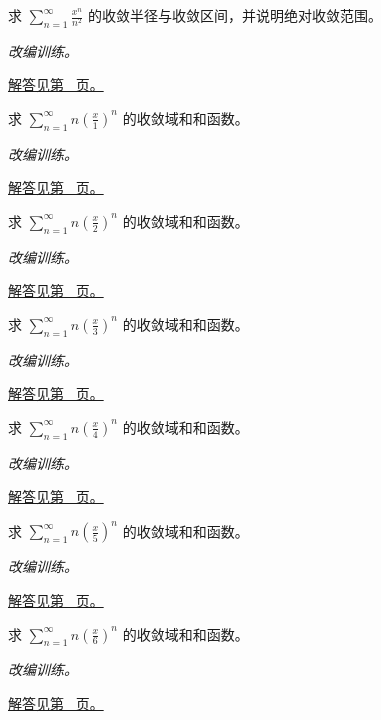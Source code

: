 \documentclass[12pt,fontset=fandol]{ctexart}
\begin{document}
\begin{example}[交错幂级数的端点]\label{ex:c26q7}
求 $\displaystyle\sum_{n=1}^\infty\frac{x^n}{n^{2}}$ 的收敛半径与收敛区间，并说明绝对收敛范围。
\par\textit{改编训练。}\par\hyperref[ans:c26q7]{解答见第~\pageref{ans:c26q7} 页。}
\end{example}
\begin{example}[几何级数导出的和函数]\label{ex:c26q8}
求 $\displaystyle\sum_{n=1}^\infty n\left(\frac x{1}\right)^n$ 的收敛域和和函数。
\par\textit{改编训练。}\par\hyperref[ans:c26q8]{解答见第~\pageref{ans:c26q8} 页。}
\end{example}
\begin{example}[几何级数导出的和函数]\label{ex:c26q9}
求 $\displaystyle\sum_{n=1}^\infty n\left(\frac x{2}\right)^n$ 的收敛域和和函数。
\par\textit{改编训练。}\par\hyperref[ans:c26q9]{解答见第~\pageref{ans:c26q9} 页。}
\end{example}
\begin{example}[几何级数导出的和函数]\label{ex:c26q10}
求 $\displaystyle\sum_{n=1}^\infty n\left(\frac x{3}\right)^n$ 的收敛域和和函数。
\par\textit{改编训练。}\par\hyperref[ans:c26q10]{解答见第~\pageref{ans:c26q10} 页。}
\end{example}
\begin{example}[几何级数导出的和函数]\label{ex:c26q11}
求 $\displaystyle\sum_{n=1}^\infty n\left(\frac x{4}\right)^n$ 的收敛域和和函数。
\par\textit{改编训练。}\par\hyperref[ans:c26q11]{解答见第~\pageref{ans:c26q11} 页。}
\end{example}
\begin{example}[几何级数导出的和函数]\label{ex:c26q12}
求 $\displaystyle\sum_{n=1}^\infty n\left(\frac x{5}\right)^n$ 的收敛域和和函数。
\par\textit{改编训练。}\par\hyperref[ans:c26q12]{解答见第~\pageref{ans:c26q12} 页。}
\end{example}
\begin{example}[几何级数导出的和函数]\label{ex:c26q13}
求 $\displaystyle\sum_{n=1}^\infty n\left(\frac x{6}\right)^n$ 的收敛域和和函数。
\par\textit{改编训练。}\par\hyperref[ans:c26q13]{解答见第~\pageref{ans:c26q13} 页。}
\end{example}
\end{document}
